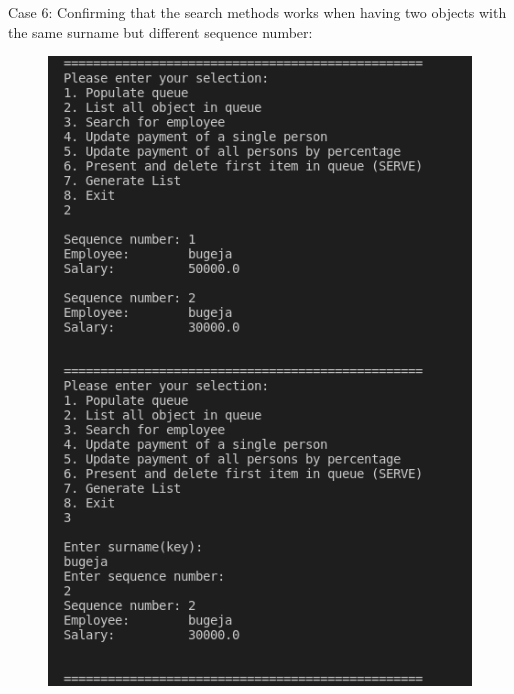 \documentclass[12pt]{article}
\begin{document}
Case 6: Confirming that the search methods works when having two objects with the same surname but different sequence number:
\begin{figure}[h]
\centering
\includegraphics[scale=0.30]{Images/Testing 3/3.png}
\end{figure}

\newpage
\end{document}
